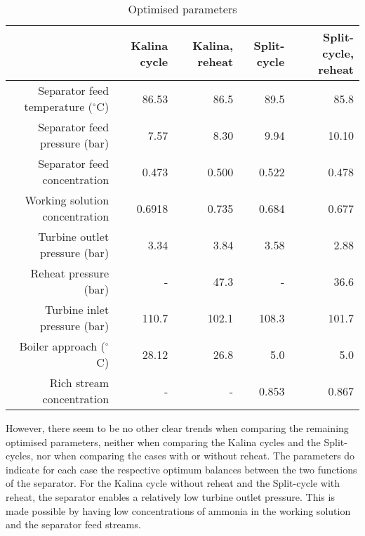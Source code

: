 \documentclass[review,3p]{elsarticle}
\begin{document}
\begin{table*}
\centering
\caption{Optimised parameters}
%
\scriptsize

\begin{tabular}{rrrrr}
\toprule
           &    Kalina cycle & Kalina, reheat & Split-cycle & Split-cycle, reheat \\
           \midrule

Separator feed temperature ($^{\circ}$C) &   86.53 &       86.5 &       89.5 &       85.8 \\

Separator feed pressure (bar) &    7.57 &        8.30 &        9.94 &       10.10 \\

Separator feed concentration &      0.473 &        0.500 &      0.522 &      0.478 \\

Working solution concentration &     0.6918 &      0.735 &      0.684 &      0.677 \\

Turbine outlet pressure (bar)&        3.34 &        3.84 &        3.58 &        2.88\\

Reheat pressure (bar)&          - &       47.3 &          - &       36.6 \\

Turbine inlet pressure (bar)&       110.7 &      102.1 &      108.3 &      101.7 \\

Boiler approach ($^{\circ}$C)&      28.12 &       26.8 &        5.0 &        5.0 \\

Rich stream concentration &           - &          - &      0.853 &      0.867 \\
\bottomrule
\end{tabular}  


\label{tab:optimParameters}
\end{table*}



However, there seem to be no other clear trends when comparing the remaining optimised parameters, neither when comparing the Kalina cycles and the Split-cycles, nor when comparing  the cases with or without reheat. The parameters do indicate for each case the respective optimum balances between the two functions of the separator. For the Kalina cycle without reheat and the Split-cycle with reheat, the separator enables a relatively low turbine outlet pressure. This is made possible by having low concentrations of ammonia in the working solution and the separator feed streams.
\end{document}
